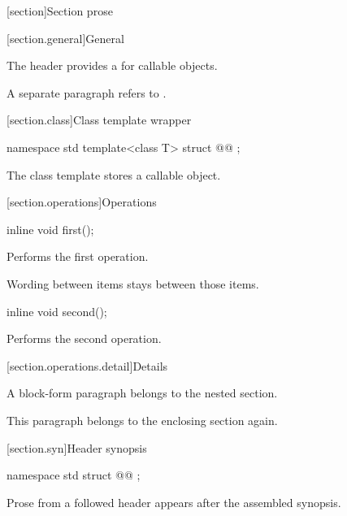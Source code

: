 [section]{Section prose}

[section.general]{General}

\pnum
The header provides a  for callable objects.

\pnum
A separate paragraph refers to .

[section.class]{Class template wrapper}

\begin{codeblock}
namespace std {
  template<class T>
  struct @@ {};
}
\end{codeblock}

\pnum
The  class template stores a callable object.

[section.operations]{Operations}

%
\begin{itemdecl}
inline void first();
\end{itemdecl}

\begin{itemdescr}
\pnum
\effects
Performs the first operation.
\end{itemdescr}

\pnum
Wording between items stays between those items.

%
\begin{itemdecl}
inline void second();
\end{itemdecl}

\begin{itemdescr}
\pnum
\effects
Performs the second operation.
\end{itemdescr}

[section.operations.detail]{Details}

\pnum
A block-form paragraph belongs to the nested section.

\pnum
This paragraph belongs to the enclosing section again.

[section.syn]{Header synopsis}

\begin{codeblock}
namespace std {
  struct @@ {};
}
\end{codeblock}

\pnum
Prose from a followed header appears after the assembled synopsis.
